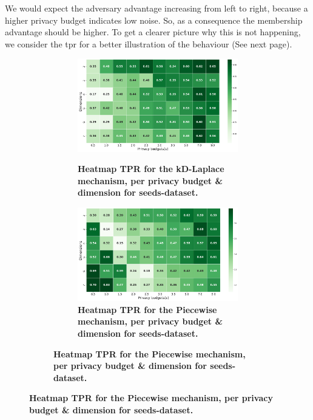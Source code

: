{We would expect the adversary advantage increasing from left to right, because a higher privacy budget indicates low noise. So, as a consequence the membership advantage should be higher.
To get a clearer picture why this is not happening, we consider the \gls{tpr} for a better illustration of the behaviour (See next page). \newpage
\begin{figure}[H]
    \centering
    \begin{subfigure}[b]{0.75\textwidth}
        \begin{subfigure}[c]{1\textwidth}
            \caption{\textbf{Heatmap TPR for the kD-Laplace mechanism, per privacy budget \& dimension for seeds-dataset.}}
            \includegraphics[width=1\textwidth]{Results/nd-laplace/nd-Laplace/seeds-dataset/tpr.png}
            \label{fig:privacy_tpr_seeds-dataset_adversial_advantage_kd-laplace}
        \end{subfigure}
        \vfill %
        \begin{subfigure}[c]{1\textwidth}
            \caption{\textbf{Heatmap TPR for the Piecewise mechanism, per privacy budget \& dimension for seeds-dataset.}}
            \includegraphics[width=1\textwidth]{Results/nd-laplace/piecewise/seeds-dataset/tpr.png}

\end{subfigure}
\end{subfigure}
\end{figure}}
